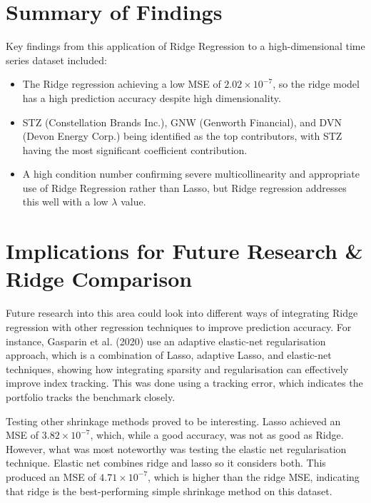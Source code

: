 \documentclass[12pt]{report} %
\begin{document}
\section{Summary of Findings}
 Key findings from this application of Ridge Regression to a high-dimensional time series dataset included:
\begin{itemize}
    \item The Ridge regression achieving a low MSE of \(2.02 \times 10^{-7}\), so the ridge model has a high prediction accuracy despite high dimensionality.
    \item STZ (Constellation Brands Inc.), GNW (Genworth Financial), and DVN (Devon Energy Corp.) being identified as the top contributors, with STZ having the most significant coefficient contribution.
    \item A high condition number confirming severe multicollinearity and appropriate use of Ridge Regression rather than Lasso, but Ridge regression addresses this well with a low \(\lambda\) value.
\end{itemize}

\section{Implications for Future Research \& Ridge Comparison}
Future research into this area could look into different ways of integrating Ridge regression with other regression techniques to improve prediction accuracy. 
For instance, Gasparin et al. (2020) use an adaptive elastic-net regularisation approach, which is a combination of Lasso, adaptive Lasso, and elastic-net techniques, showing how integrating sparsity and regularisation can effectively improve index tracking.\cite{Shu2020} This was done using a tracking error, which indicates the portfolio tracks the benchmark closely.

Testing other shrinkage methods proved to be interesting. Lasso achieved an MSE of \(3.82 \times 10^{-7}\), which, while a good accuracy, was not as good as Ridge. However, what was most noteworthy was testing the elastic net regularisation technique. Elastic net combines ridge and lasso so it considers both. This produced an MSE of \(4.71 \times 10^{-7}\), which is higher than the ridge MSE, indicating that ridge is the best-performing simple shrinkage method on this dataset.

\makeatletter
\renewcommand\@biblabel[1]{#1.} %
\makeatother


\end{document}
